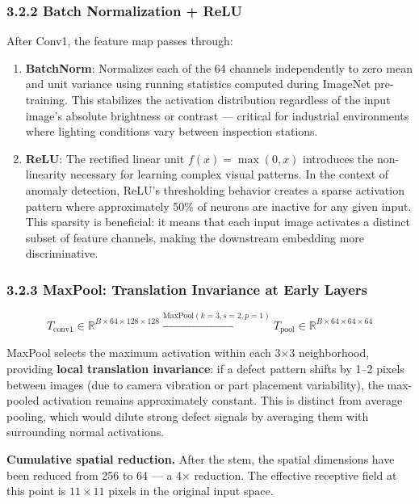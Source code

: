 \subsubsection{3.2.2 Batch Normalization + ReLU}\label{batch-normalization-relu}

After Conv1, the feature map passes through:

\begin{enumerate}
\def\labelenumi{\arabic{enumi}.}
\item
  \textbf{BatchNorm}: Normalizes each of the 64 channels independently to zero mean and unit variance using running statistics computed during ImageNet pre-training. This stabilizes the activation distribution regardless of the input image's absolute brightness or contrast --- critical for industrial environments where lighting conditions vary between inspection stations.
\item
  \textbf{ReLU}: The rectified linear unit \(f(x) = \max(0, x)\) introduces the non-linearity necessary for learning complex visual patterns. In the context of anomaly detection, ReLU's thresholding behavior creates a sparse activation pattern where approximately 50\% of neurons are inactive for any given input. This sparsity is beneficial: it means that each input image activates a distinct subset of feature channels, making the downstream embedding more discriminative.
\end{enumerate}

\subsubsection{3.2.3 MaxPool: Translation Invariance at Early Layers}\label{maxpool-translation-invariance-at-early-layers}

\[T_{\text{conv1}} \in \mathbb{R}^{B \times 64 \times 128 \times 128} \xrightarrow{\text{MaxPool}(k{=}3, s{=}2, p{=}1)} T_{\text{pool}} \in \mathbb{R}^{B \times 64 \times 64 \times 64}\]

MaxPool selects the maximum activation within each 3×3 neighborhood, providing \textbf{local translation invariance}: if a defect pattern shifts by 1--2 pixels between images (due to camera vibration or part placement variability), the max-pooled activation remains approximately constant. This is distinct from average pooling, which would dilute strong defect signals by averaging them with surrounding normal activations.

\textbf{Cumulative spatial reduction.} After the stem, the spatial dimensions have been reduced from 256 to 64 --- a 4× reduction. The effective receptive field at this point is \(11 \times 11\) pixels in the original input space.

